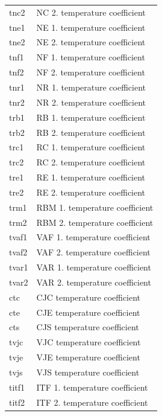 \begin{longtable}{l l}
{\small tnc2} & {\small NC 2. temperature coefficient} \\
{\small tne1} & {\small NE 1. temperature coefficient} \\
{\small tne2} & {\small NE 2. temperature coefficient} \\
{\small tnf1} & {\small NF 1. temperature coefficient} \\
{\small tnf2} & {\small NF 2. temperature coefficient} \\
{\small tnr1} & {\small NR 1. temperature coefficient} \\
{\small tnr2} & {\small NR 2. temperature coefficient} \\
{\small trb1} & {\small RB 1. temperature coefficient} \\
{\small trb2} & {\small RB 2. temperature coefficient} \\
{\small trc1} & {\small RC 1. temperature coefficient} \\
{\small trc2} & {\small RC 2. temperature coefficient} \\
{\small tre1} & {\small RE 1. temperature coefficient} \\
{\small tre2} & {\small RE 2. temperature coefficient} \\
{\small trm1} & {\small RBM 1. temperature coefficient} \\
{\small trm2} & {\small RBM 2. temperature coefficient} \\
{\small tvaf1} & {\small VAF 1. temperature coefficient} \\
{\small tvaf2} & {\small VAF 2. temperature coefficient} \\
{\small tvar1} & {\small VAR 1. temperature coefficient} \\
{\small tvar2} & {\small VAR 2. temperature coefficient} \\
{\small ctc} & {\small CJC temperature coefficient} \\
{\small cte} & {\small CJE temperature coefficient} \\
{\small cts} & {\small CJS temperature coefficient} \\
{\small tvjc} & {\small VJC temperature coefficient} \\
{\small tvje} & {\small VJE temperature coefficient} \\
{\small tvjs} & {\small VJS temperature coefficient} \\
{\small titf1} & {\small ITF 1. temperature coefficient} \\ 
{\small titf2} & {\small ITF 2. temperature coefficient} \\ 

\end{longtable}
